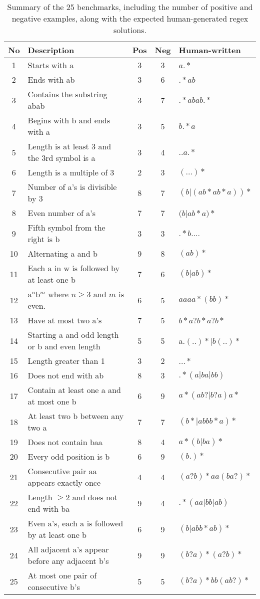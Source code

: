 \begin{table}[h!]
	\centering
	\label{tab:alpha_regex_performance_s}
	\caption{Summary of the 25 benchmarks, including the number of positive and negative examples, along with the expected human-generated regex solutions.}
	\begin{tabular}{|c|l|c|c|l|}
	\hline
	\textbf{No} & \textbf{Description} & \textbf{Pos} & \textbf{Neg} & \textbf{Human-written} \\
	\hline
	1 & Starts with a & 3 & 3 & $a.*$ \\
	2 & Ends with ab & 3 & 6 & $.*ab$ \\
	3 & Contains the substring abab & 3 & 7 & $.*abab.*$ \\
	4 & Begins with b and ends with a & 3 & 5 & $b.*a$ \\
	5 & Length is at least 3 and the 3rd symbol is a & 3 & 4 & $..a.*$ \\
	6 & Length is a multiple of 3 & 2 & 3 & $(...)*$ \\
	7 & Number of a's is divisible by 3 & 8 & 7 & $(b|(ab*ab*a))*$ \\
	8 & Even number of a's & 7 & 7 & $(b$|$ab*a)*$ \\
	9 & Fifth symbol from the right is b & 3 & 3 & $.*b....$ \\
	10 & Alternating a and b & 9 & 8 & $(ab)*$ \\
	11 & Each a in w is followed by at least one b & 7 & 6 & $(b|ab)*$ \\
	12 & a$^n$b$^m$ where $n \geq 3$ and $m$ is even. & 6 & 5 & $aaaa*(bb)*$ \\
	13 & Have at most two a's & 7 & 5 & $b*a?b*a?b*$ \\
	14 & Starting a and odd length or b and even length & 5 & 5 & a.$(..)*|b(..)*$ \\
	15 & Length greater than 1 & 3 & 2 & $...*$ \\
	16 & Does not end with ab & 8 & 3 & $.*(a|ba|bb)$ \\
	17 & Contain at least one a and at most one b & 6 & 9 & $a*(ab?|b?a)a*$ \\
	18 & At least two b between any two a & 7 & 7 & $(b*|abbb*a)*$ \\
	19 & Does not contain baa & 8 & 4 & $a*(b|ba)*$ \\
	20 & Every odd position is b & 6 & 9 & $(b.)*$ \\
	21 & Consecutive pair aa appears exactly once & 4 & 4 & $(a?b)*aa(ba?)*$ \\
	22 & Length $\ge 2$ and does not end with ba & 9 & 4 & $.*(aa|bb|ab)$ \\
	23 & Even a's, each a is followed by at least one b & 6 & 9 & $(b|abb*ab)*$ \\
	24 & All adjacent a's appear before any adjacent b's & 9 & 9 & $(b?a)*(a?b)*$ \\
	25 & At most one pair of consecutive b's & 5 & 5 & $(b?a)*bb(ab?)*$ \\
	\hline
	\end{tabular}
	\end{table}

